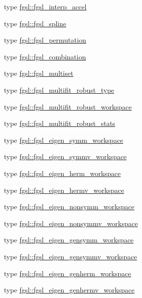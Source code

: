 \begin{DoxyCompactItemize}
type \hyperlink{structfgsl_1_1fgsl__interp__accel}{fgsl\-::fgsl\-\_\-interp\-\_\-accel}
\item 
type \hyperlink{structfgsl_1_1fgsl__spline}{fgsl\-::fgsl\-\_\-spline}
\item 
type \hyperlink{structfgsl_1_1fgsl__permutation}{fgsl\-::fgsl\-\_\-permutation}
\item 
type \hyperlink{structfgsl_1_1fgsl__combination}{fgsl\-::fgsl\-\_\-combination}
\item 
type \hyperlink{structfgsl_1_1fgsl__multiset}{fgsl\-::fgsl\-\_\-multiset}
\item 
type \hyperlink{structfgsl_1_1fgsl__multifit__robust__type}{fgsl\-::fgsl\-\_\-multifit\-\_\-robust\-\_\-type}
\item 
type \hyperlink{structfgsl_1_1fgsl__multifit__robust__workspace}{fgsl\-::fgsl\-\_\-multifit\-\_\-robust\-\_\-workspace}
\item 
type \hyperlink{structfgsl_1_1fgsl__multifit__robust__stats}{fgsl\-::fgsl\-\_\-multifit\-\_\-robust\-\_\-stats}
\item 
type \hyperlink{structfgsl_1_1fgsl__eigen__symm__workspace}{fgsl\-::fgsl\-\_\-eigen\-\_\-symm\-\_\-workspace}
\item 
type \hyperlink{structfgsl_1_1fgsl__eigen__symmv__workspace}{fgsl\-::fgsl\-\_\-eigen\-\_\-symmv\-\_\-workspace}
\item 
type \hyperlink{structfgsl_1_1fgsl__eigen__herm__workspace}{fgsl\-::fgsl\-\_\-eigen\-\_\-herm\-\_\-workspace}
\item 
type \hyperlink{structfgsl_1_1fgsl__eigen__hermv__workspace}{fgsl\-::fgsl\-\_\-eigen\-\_\-hermv\-\_\-workspace}
\item 
type \hyperlink{structfgsl_1_1fgsl__eigen__nonsymm__workspace}{fgsl\-::fgsl\-\_\-eigen\-\_\-nonsymm\-\_\-workspace}
\item 
type \hyperlink{structfgsl_1_1fgsl__eigen__nonsymmv__workspace}{fgsl\-::fgsl\-\_\-eigen\-\_\-nonsymmv\-\_\-workspace}
\item 
type \hyperlink{structfgsl_1_1fgsl__eigen__gensymm__workspace}{fgsl\-::fgsl\-\_\-eigen\-\_\-gensymm\-\_\-workspace}
\item 
type \hyperlink{structfgsl_1_1fgsl__eigen__gensymmv__workspace}{fgsl\-::fgsl\-\_\-eigen\-\_\-gensymmv\-\_\-workspace}
\item 
type \hyperlink{structfgsl_1_1fgsl__eigen__genherm__workspace}{fgsl\-::fgsl\-\_\-eigen\-\_\-genherm\-\_\-workspace}
\item 
type \hyperlink{structfgsl_1_1fgsl__eigen__genhermv__workspace}{fgsl\-::fgsl\-\_\-eigen\-\_\-genhermv\-\_\-workspace}

\end{DoxyCompactItemize}
